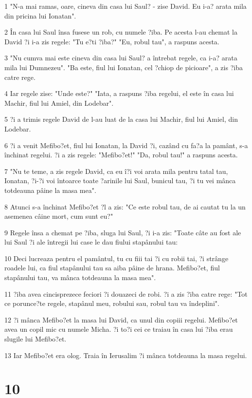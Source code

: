 \par 1 "N-a mai ramas, oare, cineva din casa lui Saul? - zise David. Eu i-a? arata mila din pricina lui Ionatan".
\par 2 În casa lui Saul însa fusese un rob, cu numele ?iba. Pe acesta l-au chemat la David ?i i-a zis regele: "Tu e?ti ?iba?" "Eu, robul tau", a raspuns acesta.
\par 3 "Nu cumva mai este cineva din casa lui Saul? a întrebat regele, ca i-a? arata mila lui Dumnezeu". "Ba este, fiul lui Ionatan, cel ?chiop de picioare", a zis ?iba catre rege.
\par 4 Iar regele zise: "Unde este?" "Iata, a raspuns ?iba regelui, el este în casa lui Machir, fiul lui Amiel, din Lodebar".
\par 5 ?i a trimis regele David de l-au luat de la casa lui Machir, fiul lui Amiel, din Lodebar.
\par 6 ?i a venit Mefibo?et, fiul lui Ionatan, la David ?i, cazând cu fa?a la pamânt, s-a închinat regelui. ?i a zis regele: "Mefibo?et!" "Da, robul tau!" a raspuns acesta.
\par 7 "Nu te teme, a zis regele David, ca eu î?i voi arata mila pentru tatal tau, Ionatan, ?i-?i voi întoarce toate ?arinile lui Saul, bunicul tau, ?i tu vei mânca totdeauna pâine la masa mea".
\par 8 Atunci s-a închinat Mefibo?et ?l a zis: "Ce este robul tau, de ai cautat tu la un asemenea câine mort, cum sunt eu?"
\par 9 Regele însa a chemat pe ?iba, sluga lui Saul, ?i i-a zis: "Toate câte au fost ale lui Saul ?i ale întregii lui case le dau fiului stapânului tau:
\par 10 Deci lucreaza pentru el pamântul, tu cu fiii tai ?i cu robii tai, ?i strânge roadele lui, ca fiul stapânului tau sa aiba pâine de hrana. Mefibo?et, fiul stapânului tau, va mânca totdeauna la masa mea".
\par 11 ?iba avea cincisprezece feciori ?i douazeci de robi. ?i a zis ?iba catre rege: "Tot ce porunce?te regele, stapânul meu, robului sau, robul tau va îndeplini".
\par 12 ?i mânca Mefibo?et la masa lui David, ca unul din copiii regelui. Mefibo?et avea un copil mic cu numele Micha. ?i to?i cei ce traiau în casa lui ?iba erau slugile lui Mefibo?et.
\par 13 Iar Mefibo?et era olog. Traia în Ierusalim ?i mânca totdeauna la masa regelui.

\chapter{10}

